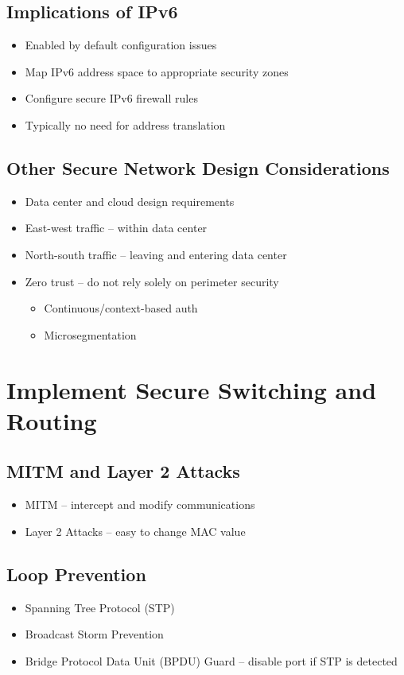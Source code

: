 	\subsection {Implications of IPv6}
		\begin{itemize}
			\item Enabled by default configuration issues
			\item Map IPv6 address space to appropriate security zones
			\item Configure secure IPv6 firewall rules
			\item Typically no need for address translation
		\end{itemize}
	\subsection {Other Secure Network Design Considerations}
		\begin{itemize}
			\item Data center and cloud design requirements
			\item East-west traffic -- within data center
			\item North-south traffic -- leaving and entering data center
			\item Zero trust -- do not rely solely on perimeter security
				\begin{itemize}
					\item Continuous/context-based auth
					\item Microsegmentation
				\end{itemize}
		\end{itemize}

\section {Implement Secure Switching and Routing}
	\subsection {MITM and Layer 2 Attacks}
		\begin{itemize}
			\item MITM -- intercept and modify communications
			\item Layer 2 Attacks -- easy to change MAC value
		\end{itemize}
	\subsection {Loop Prevention}
		\begin{itemize}
			\item Spanning Tree Protocol (STP)
			\item Broadcast Storm Prevention
			\item Bridge Protocol Data Unit (BPDU) Guard -- disable port if STP is detected
		\end{itemize}
